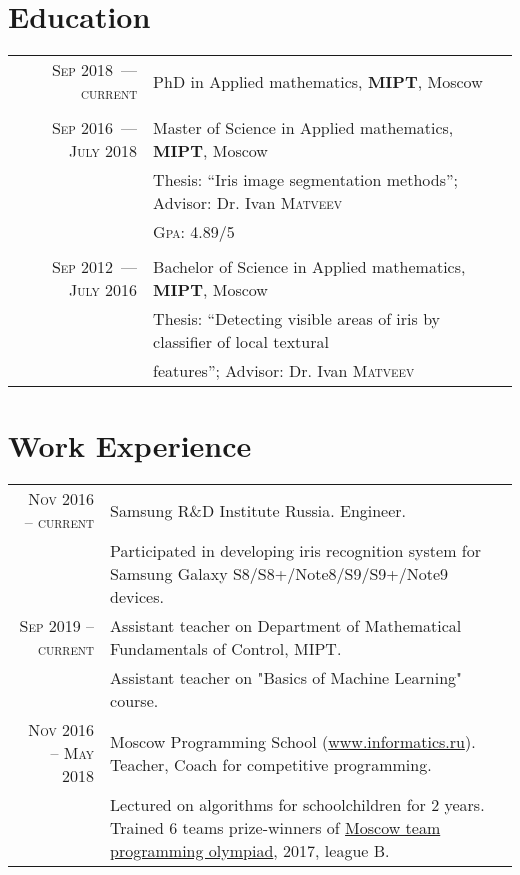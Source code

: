 \documentclass[a4paper,10pt]{article}
\begin{document}
\section{Education}
\begin{tabular}{r|p{10.5cm}}	
\textsc{Sep} 2018~--- \textsc{current} & PhD in Applied mathematics, \textbf{MIPT}, Moscow\\
\\
\textsc{Sep} 2016~--- \textsc{July} 2018 & Master of Science in Applied mathematics, \textbf{MIPT}, Moscow\\
& Thesis: ``Iris image segmentation methods''; \small Advisor: Dr. Ivan \textsc{Matveev}\\
&\normalsize \textsc{Gpa}: 4.89/5\\
\\
\textsc{Sep} 2012~--- \textsc{July} 2016 & Bachelor of Science in Applied mathematics, \textbf{MIPT}, Moscow\\
& Thesis: ``Detecting visible areas of iris by classifier of local textural \\ 
& features''; \small Advisor: Dr. Ivan \textsc{Matveev}\\
\end{tabular}


\section{Work Experience}
\begin{tabular}{r|p{10.5cm}}
\textsc{Nov 2016} -- \textsc{current}  & Samsung R\&D Institute Russia. Engineer.\\
                                       & \parbox{10.5cm}{\small Participated in developing iris recognition system for Samsung Galaxy S8/S8+/Note8/S9/S9+/Note9 devices.}
\\
\textsc{Sep 2019} -- \textsc{current}  & Assistant teacher on Department of Mathematical Fundamentals of Control, MIPT.\\
                                       & \parbox{10.5cm}{\small Assistant teacher on "Basics of Machine Learning" course.}
\\
\textsc{Nov 2016} -- \textsc{May 2018} & Moscow Programming School (\href{www.informatics.ru}{www.informatics.ru}). Teacher, Coach for competitive programming.\\
                                      & \small Lectured on algorithms for schoolchildren for 2 years. Trained 6 teams prize-winners of \href{https://olympiads.ru/team/}{Moscow team programming olympiad}, 2017, league B.

\end{tabular}
\end{document}
